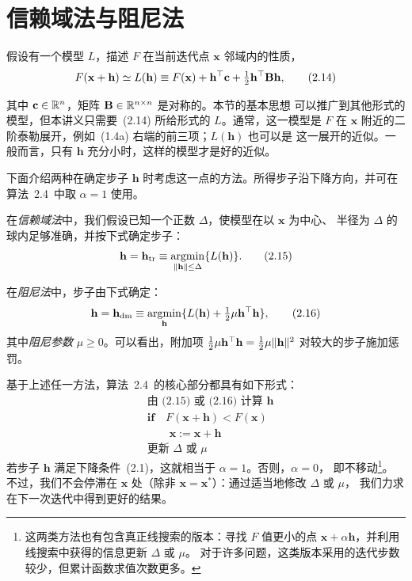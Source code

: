 \section{信赖域法与阻尼法}
假设有一个模型 $L$，描述 $F$ 在当前迭代点 $\mathbf{x}$ 邻域内的性质，
\begin{equation}
  F(\mathbf{x}+\mathbf{h})\simeq L(\mathbf{h})
  \equiv F(\mathbf{x})+\mathbf{h}^{\top}\mathbf{c}
       +\tfrac12\mathbf{h}^{\top}\mathbf{B}\mathbf{h},
  \tag{2.14}\label{eq:2.14}
\end{equation}

其中 $\mathbf{c}\in\mathbb{R}^n$，矩阵 $\mathbf{B}\in\mathbb{R}^{n\times n}$ 是对称的。本节的基本思想
可以推广到其他形式的模型，但本讲义只需要~(2.14) 所给形式的 $L$。通常，这一模型是
$F$ 在 $\mathbf{x}$ 附近的二阶泰勒展开，例如~(1.4a) 右端的前三项；$L(\mathbf{h})$ 也可以是
这一展开的近似。一般而言，只有 $\mathbf{h}$ 充分小时，这样的模型才是好的近似。

下面介绍两种在确定步子 $\mathbf{h}$ 时考虑这一点的方法。所得步子沿下降方向，并可在
算法~2.4~中取 $\alpha=1$ 使用。

在\emph{信赖域法}中，我们假设已知一个正数 $\Delta$，使模型在以 $\mathbf{x}$ 为中心、
半径为 $\Delta$ 的球内足够准确，并按下式确定步子：
\begin{equation}
  \mathbf{h}=\mathbf{h}_{\mathrm{tr}}
  \equiv\operatorname*{argmin}_{\lVert\mathbf{h}\rVert\leq\Delta}\{L(\mathbf{h})\}.
  \tag{2.15}\label{eq:2.15}
\end{equation}

在\emph{阻尼法}中，步子由下式确定：
\begin{equation}
  \mathbf{h}=\mathbf{h}_{\mathrm{dm}}
  \equiv\operatorname*{argmin}_{\mathbf{h}}
  \{L(\mathbf{h})+\tfrac12\mu\mathbf{h}^{\top}\mathbf{h}\},
  \tag{2.16}\label{eq:2.16}
\end{equation}
其中\emph{阻尼参数} $\mu\geq0$。可以看出，附加项
$\tfrac12\mu\mathbf{h}^{\top}\mathbf{h}=\tfrac12\mu\lVert\mathbf{h}\rVert^2$ 对较大的步子施加惩罚。

基于上述任一方法，算法~2.4~的核心部分都具有如下形式：
\begin{equation}
\begin{aligned}
  &\text{由~(2.15) 或~(2.16) 计算 }\mathbf{h}\\
  &\textbf{if}\quad F(\mathbf{x}+\mathbf{h})<F(\mathbf{x})\\
  &\qquad\mathbf{x}:=\mathbf{x}+\mathbf{h}\\
  &\text{更新 }\Delta\text{ 或 }\mu
\end{aligned}
\tag{2.17}\label{eq:2.17}
\end{equation}
若步子 $\mathbf{h}$ 满足下降条件~(2.1)，这就相当于 $\alpha=1$。否则，$\alpha=0$，
即不移动\footnote{这两类方法也有包含真正线搜索的版本：寻找 $F$ 值更小的点
$\mathbf{x}+\alpha\mathbf{h}$，并利用线搜索中获得的信息更新 $\Delta$ 或 $\mu$。
对于许多问题，这类版本采用的迭代步数较少，但累计函数求值次数更多。}。
不过，我们不会停滞在
$\mathbf{x}$ 处（除非 $\mathbf{x}=\mathbf{x}^{\ast}$）：通过适当地修改 $\Delta$ 或 $\mu$，
我们力求在下一次迭代中得到更好的结果。

